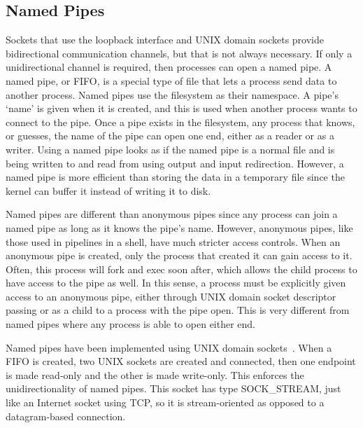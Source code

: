 \subsection{Named Pipes}
\label{sec:namedPipes}
Sockets that use the loopback interface and UNIX domain sockets provide bidirectional communication channels, but that is not always necessary.  If only a unidirectional channel is required, then processes can open a named pipe.  A named pipe, or FIFO, is a special type of file that lets a process send data to another process.  Named pipes use the filesystem as their namespace.  A pipe's `name' is given when it is created, and this is used when another process wants to connect to the pipe.  Once a pipe exists in the filesystem, any process that knows, or guesses, the name of the pipe can open one end, either as a reader or as a writer.  Using a named pipe looks as if the named pipe is a normal file and is being written to and read from using output and input redirection.  However, a named pipe is more efficient than storing the data in a temporary file since the kernel can buffer it instead of writing it to disk.

Named pipes are different than anonymous pipes since any process can join a named pipe as long as it knows the pipe's name.  However, anonymous pipes, like those used in pipelines in a shell, have much stricter access controls.  When an anonymous pipe is created, only the process that created it can gain access to it.  Often, this process will fork and exec soon after, which allows the child process to have access to the pipe as well.  In this sense, a process must be explicitly given access to an anonymous pipe, either through UNIX domain socket descriptor passing or as a child to a process with the pipe open.  This is very different from named pipes where any process is able to open either end.

Named pipes have been implemented using UNIX domain sockets~\cite[p 1147]{singh2006mac}.  When a FIFO is created, two UNIX sockets are created and connected, then one endpoint is made read-only and the other is made write-only.  This enforces the unidirectionality of named pipes.  This socket has type SOCK\_STREAM, just like an Internet socket using TCP, so it is stream-oriented as opposed to a datagram-based connection.


